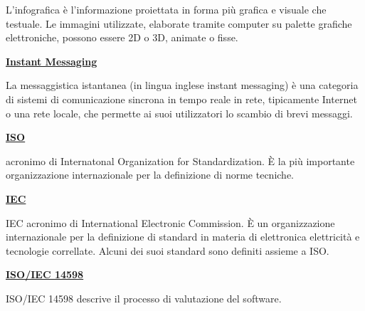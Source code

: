 \medskip
\begin{addmargin}[5em]{1em}	
L'infografica è l'informazione proiettata in forma più grafica e visuale che testuale. Le immagini utilizzate, elaborate tramite computer su palette grafiche elettroniche, possono essere 2D o 3D, animate o fisse.
\end{addmargin}	

\bigskip
\begin{addmargin}[0em]{0em}		
	\textbf{\underline{Instant Messaging}}
\end{addmargin}

\medskip
\begin{addmargin}[5em]{1em}	
La messaggistica istantanea (in lingua inglese instant messaging) è una categoria di sistemi di comunicazione sincrona in tempo reale in rete, tipicamente Internet o una rete locale, che permette ai suoi utilizzatori lo scambio di brevi messaggi.
\end{addmargin}	

\bigskip
\begin{addmargin}[0em]{0em}
	\textbf{\underline{ISO}}
\end{addmargin}
	
\medskip
\begin{addmargin}[5em]{1em}	
acronimo di Internatonal Organization for Standardization. È la più importante organizzazione internazionale per la definizione di norme tecniche. 
\end{addmargin}

\bigskip
\begin{addmargin}[0em]{0em}
	\textbf{\underline{IEC}}
\end{addmargin}
	
\medskip
\begin{addmargin}[5em]{1em}	
IEC acronimo di International Electronic Commission. È un organizzazione internazionale per la definizione di standard in materia di elettronica elettricità e tecnologie correllate. Alcuni dei suoi standard sono definiti assieme a ISO.
\end{addmargin}	

\bigskip
\begin{addmargin}[0em]{0em}
	\textbf{\underline{ISO/IEC 14598}}
\end{addmargin}
	
\medskip
\begin{addmargin}[5em]{1em}	
ISO/IEC 14598 descrive il processo di valutazione del software.  
\end{addmargin}	

